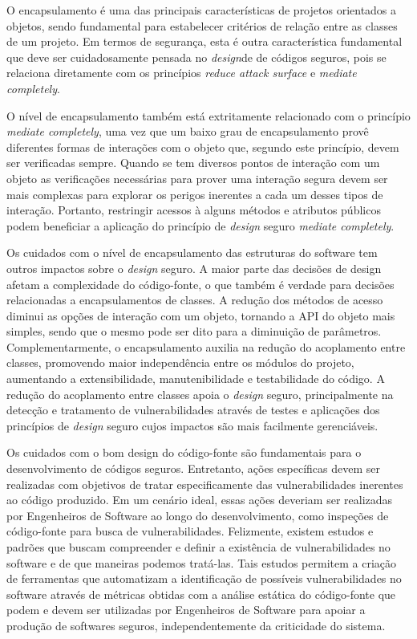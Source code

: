 %

O encapsulamento é uma das principais características de projetos orientados a objetos, sendo fundamental para estabelecer critérios de relação entre as classes de um projeto. Em termos de segurança, esta é outra característica fundamental que deve ser cuidadosamente pensada no \emph{design}de de códigos seguros, pois se relaciona diretamente com os princípios \emph{reduce attack surface} e \emph{mediate completely}.

O nível de encapsulamento também está extritamente relacionado com o princípio \emph{mediate completely}, uma vez que um baixo grau de encapsulamento provê diferentes formas de interações com o objeto que, segundo este princípio, devem ser verificadas sempre. Quando se tem diversos pontos de interação com um objeto as verificações necessárias para prover uma interação segura devem ser mais complexas para explorar os perigos inerentes a cada um desses tipos de interação. Portanto, restringir acessos à alguns métodos e atributos públicos podem beneficiar a aplicação do princípio de \emph{design} seguro \emph{mediate completely}.

%

Os cuidados com o nível de encapsulamento das estruturas do software tem outros impactos sobre o \emph{design} seguro. A maior parte das decisões de design afetam a complexidade do código-fonte, o que também é verdade para decisões relacionadas a encapsulamentos de classes. A redução dos métodos de acesso diminui as opções de interação com um objeto, tornando a API do objeto mais simples, sendo que o mesmo pode ser dito para a diminuição de parâmetros. Complementarmente, o encapsulamento auxilia na redução do acoplamento entre classes, promovendo maior independência entre os módulos do projeto, aumentando a extensibilidade, manutenibilidade e testabilidade do código. A redução do acoplamento entre classes apoia o \emph{design} seguro, principalmente na detecção e tratamento de vulnerabilidades através de testes e aplicações dos princípios de \emph{design} seguro cujos impactos são mais facilmente gerenciáveis.

%


Os cuidados com o bom design do código-fonte são fundamentais para o desenvolvimento de códigos seguros. Entretanto, ações específicas devem ser realizadas com objetivos de tratar especificamente das vulnerabilidades inerentes ao código produzido. Em um cenário ideal, essas ações deveriam ser realizadas por Engenheiros de Software ao longo do desenvolvimento, como inspeções de código-fonte para busca de vulnerabilidades. Felizmente, existem estudos e padrões que buscam compreender e definir a existência de vulnerabilidades no software e de que maneiras podemos tratá-las. Tais estudos permitem a criação de ferramentas que automatizam a identificação de possíveis vulnerabilidades no software através de métricas obtidas com a análise estática do código-fonte que podem e devem ser utilizadas por Engenheiros de Software para apoiar a produção de softwares seguros, independentemente da criticidade do sistema. 

